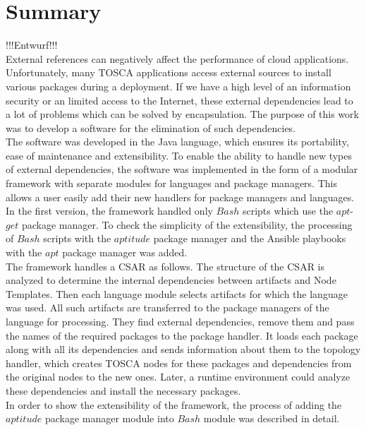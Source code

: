 
\chapter{Summary}\label{chap:zusfas}
!!!Entwurf!!!\\
External references can negatively affect the performance of cloud applications.
Unfortunately, many TOSCA applications access external sources to install various packages during a deployment.
If we have a high level of an information security or an limited access to the Internet, these external dependencies lead to a lot of problems which can be solved by encapsulation.
The purpose of this work was to develop a software for the elimination of such dependencies.\\
The software was developed in the Java language, which ensures its portability, ease of maintenance and extensibility.
To enable the ability to handle new types of external dependencies, the software was implemented in the form of a modular framework with separate modules for languages and package managers.
This allows a user easily add their new handlers for package managers and languages.
In the first version, the framework handled only $Bash$ scripts  which use the $apt$-$get$ package manager.
To check the simplicity of the extensibility, the processing of $Bash$ scripts with the $aptitude$ package manager and the Ansible playbooks with the $apt$ package manager was added.\\
The framework handles a CSAR as follows.
The structure of the CSAR is analyzed to determine the internal dependencies between artifacts and Node Templates.
Then each language module selects artifacts for which the language was used.
All such artifacts are transferred to the package managers of the language for processing.
They find external dependencies, remove them and pass the names of the required packages to the package handler.
It loads each package along with all its dependencies and sends information about them to the topology handler, which creates TOSCA nodes for these packages and dependencies from the original nodes to the new ones.
Later, a runtime environment could analyze these dependencies and install the necessary packages.\\
In order to show the extensibility of the framework, the process of adding the $aptitude$ package manager module into $Bash$ module was described in detail.
